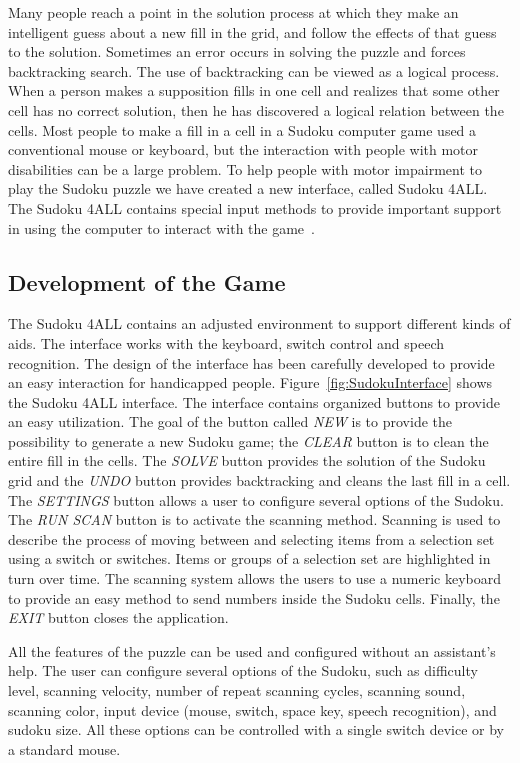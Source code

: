 \documentclass[doublespace,11pt]{article}
\begin{document}
\begin{spacing}{1}
Many people reach a point in the solution process at which they make an intelligent guess about a new fill 
in the grid, and follow the effects of that guess to the solution. Sometimes an 
error occurs in solving the puzzle and forces backtracking search. The use of backtracking can be viewed 
as a logical process. When a person makes a supposition fills in one cell and realizes that some other cell has no correct 
solution, then he has discovered a logical relation between the cells. Most 
people to make a fill in a cell in a Sudoku computer game used a conventional mouse or keyboard, 
but the interaction with people with motor disabilities can be a large problem.
To help people with motor impairment to play the Sudoku puzzle we have created 
a new interface, called Sudoku 4ALL. The Sudoku 4ALL contains special input 
methods to provide important support in using the computer to interact with the game~\cite{Gilligan:06}.



\subsection{Development of the Game}

The Sudoku 4ALL contains an adjusted environment to support 
different kinds of aids. The interface works with the keyboard, switch control and speech 
recognition. The design of the interface has been carefully developed to provide an easy interaction 
for handicapped people. Figure~\ref{fig:SudokuInterface} shows the Sudoku 4ALL interface. 
The interface contains organized buttons to provide an easy utilization. The goal of the button called \emph{NEW}
is to provide the possibility to generate a new Sudoku game; the \emph{CLEAR} button is to clean the 
entire fill in the cells. The \emph{SOLVE} button provides the solution of the Sudoku grid and the \emph{UNDO} 
button provides backtracking and cleans the last fill in a cell. The \emph{SETTINGS} button allows a user to 
configure several options of the Sudoku. The \emph{RUN SCAN} button is to activate the scanning method. 
Scanning is used to describe the process of moving between and selecting items from a selection set 
using a switch or switches. Items or groups of a selection set are highlighted in turn over time. The 
scanning system allows the users to use a numeric keyboard to provide an easy method to send numbers inside the Sudoku cells.
Finally, the \emph{EXIT} button closes the application.

All the features of the puzzle can be used and configured without an assistant's help. 
The user can configure several options of the Sudoku, such as difficulty level, scanning velocity, 
number of repeat scanning cycles, scanning sound, scanning color, input device (mouse, switch, space 
key, speech recognition), and sudoku size.   
All these options can be controlled with a single switch device or by a standard mouse. 



\end{spacing}
\end{document}
